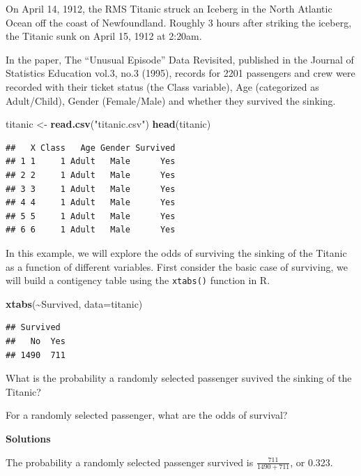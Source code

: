 \documentclass[
]{book}
\newenvironment{Shaded}{\begin{snugshade}}{\end{snugshade}}
\newcommand{\AttributeTok}[1]{\textcolor[rgb]{0.13,0.29,0.53}{#1}}
\newcommand{\FunctionTok}[1]{\textcolor[rgb]{0.13,0.29,0.53}{\textbf{#1}}}
\newcommand{\NormalTok}[1]{#1}
\newcommand{\OtherTok}[1]{\textcolor[rgb]{0.56,0.35,0.01}{#1}}
\newcommand{\SpecialCharTok}[1]{\textcolor[rgb]{0.81,0.36,0.00}{\textbf{#1}}}
\newcommand{\StringTok}[1]{\textcolor[rgb]{0.31,0.60,0.02}{#1}}
\begin{document}
On April 14, 1912, the RMS Titanic struck an Iceberg in the North Atlantic Ocean off the coast of Newfoundland. Roughly 3 hours after striking the iceberg, the Titanic sunk on April 15, 1912 at 2:20am.

In the paper, The ``Unusual Episode'' Data Revisited, published in the Journal of Statistics Education vol.3, no.3 (1995), records for 2201 passengers and crew were recorded with their ticket status (the Class variable), Age (categorized as Adult/Child), Gender (Female/Male) and whether they survived the sinking.

\begin{Shaded}
\begin{Highlighting}[]
\NormalTok{titanic }\OtherTok{\textless{}{-}} \FunctionTok{read.csv}\NormalTok{(}\StringTok{"titanic.csv"}\NormalTok{)}
\FunctionTok{head}\NormalTok{(titanic)}
\end{Highlighting}
\end{Shaded}

\begin{verbatim}
##   X Class   Age Gender Survived
## 1 1     1 Adult   Male      Yes
## 2 2     1 Adult   Male      Yes
## 3 3     1 Adult   Male      Yes
## 4 4     1 Adult   Male      Yes
## 5 5     1 Adult   Male      Yes
## 6 6     1 Adult   Male      Yes
\end{verbatim}

In this example, we will explore the odds of surviving the sinking of the Titanic as a function of different variables. First consider the basic case of surviving, we will build a contigency table using the \texttt{xtabs()} function in R.

\begin{Shaded}
\begin{Highlighting}[]
\FunctionTok{xtabs}\NormalTok{(}\SpecialCharTok{\textasciitilde{}}\NormalTok{Survived, }\AttributeTok{data=}\NormalTok{titanic)}
\end{Highlighting}
\end{Shaded}

\begin{verbatim}
## Survived
##   No  Yes 
## 1490  711
\end{verbatim}

What is the probability a randomly selected passenger suvived the sinking of the Titanic?

For a randomly selected passenger, what are the odds of survival?

\textbf{Solutions}

The probability a randomly selected passenger survived is \(\frac{711}{1490+711}\), or 0.323.
\end{document}
